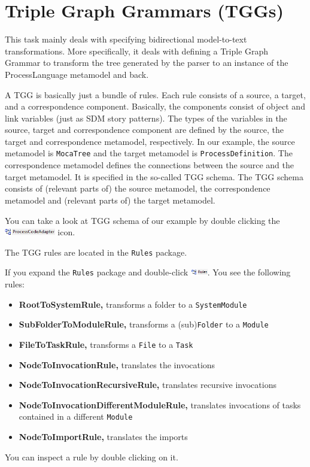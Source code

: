 \section{Triple Graph Grammars (TGGs)}

This task mainly deals with specifying bidirectional model-to-text transformations. 
More specifically, it deals with defining a Triple Graph Grammar to transform the tree generated by the parser to  an instance of the ProcessLanguage metamodel and back.


A TGG is basically just a bundle of rules. 
Each rule consists of a source, a target, and a correspondence component.  
Basically, the components consist of object and link variables (just as SDM story patterns). 
The types of the variables in the source, target and correspondence component are defined by the source, the target and correspondence metamodel, respectively.
In our example, the source metamodel is \texttt{MocaTree} and the target metamodel is \texttt{ProcessDefinition}. 
The correspondence metamodel defines the connections between the source and the target metamodel. 
It is specified in the so-called TGG schema. The TGG schema consists of (relevant parts of) the source metamodel, the correspondence metamodel and (relevant parts of) the target metamodel.

You can take a look at TGG schema of our example by double clicking the \includegraphics[height=0.3cm]{figures/processCodeAdapterMM.png} icon.


The TGG rules are located in the \texttt{Rules} package.  

If you expand the \texttt{Rules} package and double-click \includegraphics[height=0.3cm]{figures/RulesMM.png}. You see the following rules:
\begin{itemize}
   \item \textbf{RootToSystemRule,} transforms a folder to a \texttt{SystemModule}
   \item \textbf{SubFolderToModuleRule,} transforms a (sub)\texttt{Folder} to a \texttt{Module}
   \item \textbf{FileToTaskRule,} transforms a \texttt{File} to a \texttt{Task}
   \item \textbf{NodeToInvocationRule,} translates the invocations
   \item \textbf{NodeToInvocationRecursiveRule,} translates recursive invocations
   \item \textbf{NodeToInvocationDifferentModuleRule,} translates invocations of tasks contained in a different \texttt{Module}
   \item \textbf{NodeToImportRule,} translates the imports 
\end{itemize}
You can inspect a rule by double clicking on it.


